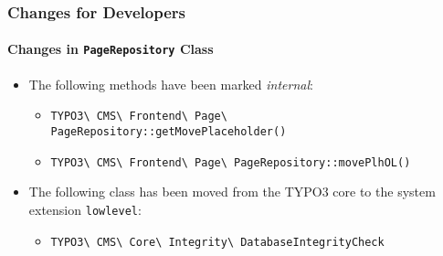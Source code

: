
\begin{frame}[fragile]
	\frametitle{Changes for Developers}
	\framesubtitle{Changes in \texttt{PageRepository} Class}

	\begin{itemize}
		\item The following methods have been marked \textit{internal}:

			\begin{itemize}
			\smaller
				\item \texttt{TYPO3\textbackslash
					CMS\textbackslash
					Frontend\textbackslash
					Page\textbackslash
					PageRepository::getMovePlaceholder()}

				\item \texttt{TYPO3\textbackslash
					CMS\textbackslash
					Frontend\textbackslash
					Page\textbackslash
					PageRepository::movePlhOL()}
			\end{itemize}

		\item The following class has been moved from the TYPO3 core to the
			system extension \texttt{lowlevel}:

			\begin{itemize}
			\smaller
				\item \texttt{TYPO3\textbackslash
					CMS\textbackslash
					Core\textbackslash
					Integrity\textbackslash
					DatabaseIntegrityCheck}
			\end{itemize}

	\end{itemize}

\end{frame}


